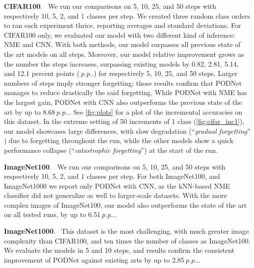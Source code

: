\documentclass[runningheads]{llncs}
\makeatletter
\newcommand{\fs}{\@ifnextchar.{}{.}}\makeatother
\newcommand{\parag}[1]{\vspace{0.2cm}\noindent\textbf{#1}.\ }
\newcommand{\pp}{\,\textit{p.p}\fs}
\makeatother
\begin{document}
\parag{CIFAR100} We run our comparisons on 5, 10, 25, and 50 steps with respectively 10, 5, 2, and 1 classes per step. We created three random class orders to ran each experiment thrice, reporting averages and standard deviations. For CIFAR100 only, we evaluated our model with two different kind of inference: NME and CNN. With both methods, our model surpasses all previous state of the art models on all steps. Moreover, our model relative improvement grows as the number the steps increases, surpassing existing models by 0.82, 2.81, 5.14, and 12.1 percent points (\pp) for respectively 5, 10, 25, and 50 steps. Larger numbers of steps imply  stronger forgetting; those results confirm that PODNet manages to reduce drastically the said forgetting. While PODNet with NME has the largest gain, PODNet with CNN also outperforms the previous state of the art by up to 8.68\pp. See \autoref{fig:plots} for a plot of the incremental accuracies on this dataset. In the extreme setting of 50 increments of 1 class (\autoref{fig:cifar_inc1}), our model showcases large differences, with slow degradation (``\textit{gradual forgetting}'' \cite{french1999catastrophicforgetting}) due to forgetting throughout the run, while the other models show a quick performance collapse (``\textit{catastrophic forgetting}'') at the start of the run.

\parag{ImageNet100} We run our comparisons on 5, 10, 25, and 50 steps with respectively 10, 5, 2, and 1 classes per step. For both ImageNet100, and ImageNet1000 we report only PODNet with CNN, as the kNN-based NME classifier did not generalize as well to larger-scale datasets. With the more complex images of ImageNet100, our model also outperforms the state of the art on all tested runs, by up to 6.51\pp.

\parag{ImageNet1000} This dataset is the most challenging, with much greater image complexity than CIFAR100, and ten times the number of classes as ImageNet100. We evaluate the models in 5 and 10 steps, and results confirm the consistent improvement of PODNet against existing arts by up to 2.85\pp. 
\end{document}
